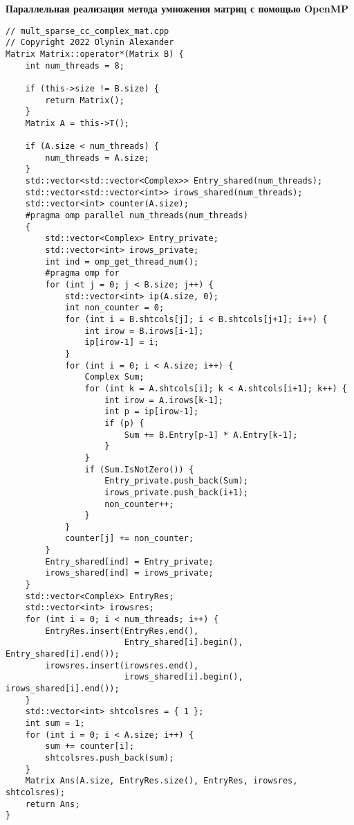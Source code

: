 \documentclass{report}
\begin{document}
\textbf{Параллельная реализация метода умножения матриц с помощью OpenMP}
\begin{lstlisting}
// mult_sparse_cc_complex_mat.cpp
// Copyright 2022 Olynin Alexander
Matrix Matrix::operator*(Matrix B) {
    int num_threads = 8;

    if (this->size != B.size) {
        return Matrix();
    }
    Matrix A = this->T();

    if (A.size < num_threads) {
        num_threads = A.size;
    }
    std::vector<std::vector<Complex>> Entry_shared(num_threads);
    std::vector<std::vector<int>> irows_shared(num_threads);
    std::vector<int> counter(A.size);
    #pragma omp parallel num_threads(num_threads)
    {
        std::vector<Complex> Entry_private;
        std::vector<int> irows_private;
        int ind = omp_get_thread_num();
        #pragma omp for
        for (int j = 0; j < B.size; j++) {
            std::vector<int> ip(A.size, 0);
            int non_counter = 0;
            for (int i = B.shtcols[j]; i < B.shtcols[j+1]; i++) {
                int irow = B.irows[i-1];
                ip[irow-1] = i;
            }
            for (int i = 0; i < A.size; i++) {
                Complex Sum;
                for (int k = A.shtcols[i]; k < A.shtcols[i+1]; k++) {
                    int irow = A.irows[k-1];
                    int p = ip[irow-1];
                    if (p) {
                        Sum += B.Entry[p-1] * A.Entry[k-1];
                    }
                }
                if (Sum.IsNotZero()) {
                    Entry_private.push_back(Sum);
                    irows_private.push_back(i+1);
                    non_counter++;
                }
            }
            counter[j] += non_counter;
        }
        Entry_shared[ind] = Entry_private;
        irows_shared[ind] = irows_private;
    }
    std::vector<Complex> EntryRes;
    std::vector<int> irowsres;
    for (int i = 0; i < num_threads; i++) {
        EntryRes.insert(EntryRes.end(),
                        Entry_shared[i].begin(), Entry_shared[i].end());
        irowsres.insert(irowsres.end(),
                        irows_shared[i].begin(), irows_shared[i].end());
    }
    std::vector<int> shtcolsres = { 1 };
    int sum = 1;
    for (int i = 0; i < A.size; i++) {
        sum += counter[i];
        shtcolsres.push_back(sum);
    }
    Matrix Ans(A.size, EntryRes.size(), EntryRes, irowsres, shtcolsres);
    return Ans;
}
\end{lstlisting}
\end{document}
